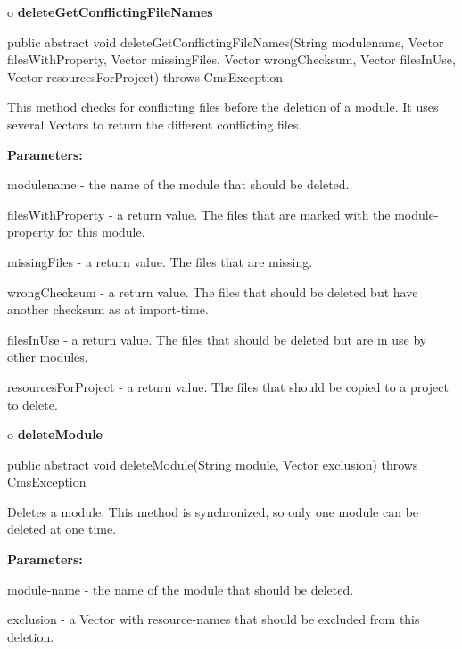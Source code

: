 o {\bf deleteGetConflictingFileNames} 

\begin{PRE}
 public abstract void deleteGetConflictingFileNames(String modulename,
                                                    Vector filesWithProperty,
                                                    Vector missingFiles,
                                                    Vector wrongChecksum,
                                                    Vector filesInUse,
                                                    Vector resourcesForProject) throws CmsException
\end{PRE}

\begin{description}
\htmlDD This method checks for conflicting files before the deletion of a
module. It uses several Vectors to return the different conflicting files. 

\begin{description}
\item {\bf Parameters:}  

modulename - the name of the module that should be deleted.  

filesWithProperty - a return value. The files that are marked with the
module-property for this module.  

missingFiles - a return value. The files that are missing.  

wrongChecksum - a return value. The files that should be deleted but have
another checksum as at import-time.  

filesInUse - a return value. The files that should be deleted but are in use
by other modules.  

resourcesForProject - a return value. The files that should be copied to a
project to delete.  
\end{description}

\end{description}

o {\bf deleteModule} 

\begin{PRE}
 public abstract void deleteModule(String module,
                                   Vector exclusion) throws CmsException
\end{PRE}

\begin{description}
\htmlDD Deletes a module. This method is synchronized, so only one module can
be deleted at one time. 

\begin{description}
\item {\bf Parameters:}  

module-name - the name of the module that should be deleted.  

exclusion - a Vector with resource-names that should be excluded from this
deletion.  
\end{description}

\end{description}

